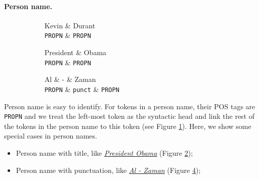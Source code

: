 \documentclass[11pt,a4paper]{article}
\begin{document}
\paragraph{Person name.} 
\begin{figure}[t]
	\begin{subfigure}[t]{0.3\columnwidth}
		\centering
		\small
		\begin{dependency}[edge slant=2, text only label, label style=above]
			\begin{deptext}
				Kevin \& Durant \\
				\texttt{PROPN} \& \texttt{PROPN} \\
			\end{deptext}
		\end{dependency}
	\caption{}\label{fig:per-name:vanilla}
	\end{subfigure}
	\begin{subfigure}[t]{0.3\columnwidth}
		\centering
		\small
		\begin{dependency}[edge slant=2, text only label, label style=above]
			\begin{deptext}
				President \& Obama \\
				\texttt{PROPN} \& \texttt{PROPN} \\
			\end{deptext}
		\end{dependency}
	\caption{}\label{fig:per-name:title}
	\end{subfigure}
	\begin{subfigure}[t]{0.3\columnwidth}
		\centering
		\small
		\begin{dependency}[edge slant=2, text only label, label style=above]
			\begin{deptext}
				Al \& - \& Zaman \\
				\texttt{PROPN} \& \texttt{punct} \& \texttt{PROPN} \\
			\end{deptext}
		\end{dependency}
		\caption{}\label{fig:per-name:punct}
	\end{subfigure}
\end{figure}
Person name is easy to identify.
For tokens in a person name, their POS tags are \texttt{PROPN} and
we treat the left-most token as the syntactic head
and link the rest of the tokens in the person name to this token (see Figure \ref{fig:per-name:vanilla}).
Here, we show some special cases in person names.
\begin{itemize}
	\item Person name with title, like \underline{\textit{President Obama}} (Figure \ref{fig:per-name:title});
	\item Person name with punctuation, like \underline{\textit{Al - Zaman}} (Figure \ref{fig:per-name:punct});
\end{itemize}
\end{document}
